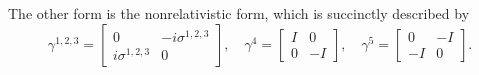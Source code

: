The other form is the nonrelativistic form, which is succinctly described by
\begin{equation}
\gamma^{1,2,3} = \begin{bmatrix} 0 & -i \sigma^{1,2,3} \\ i \sigma^{1,2,3} & 0 \end{bmatrix}, \quad \gamma^4=\begin{bmatrix} I & 0 \\ 0 & -I \end{bmatrix}, \quad  \gamma^5=\begin{bmatrix} 0 & -I \\ -I & 0 \end{bmatrix}.
\end{equation}

